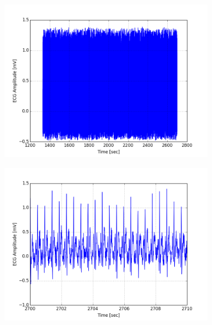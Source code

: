 \documentclass[paper=a4, fontsize=11pt]{scrartcl}
\numberwithin{equation}{section}		%
\numberwithin{figure}{section}			%
\numberwithin{table}{section}		    %
\begin{document}
\begin{appendices}
\begin{figure}[H]
	\centering
	\begin{subfigure}[b]{0.3\textwidth}
		\includegraphics[width=\textwidth]{sim/ecg_40}
	\end{subfigure}
	\begin{subfigure}[b]{0.3\textwidth}
		\includegraphics[width=\textwidth]{sim/ecg_41}
	\end{subfigure}
	\begin{subfigure}[b]{0.3\textwidth}

\end{subfigure}
\end{figure}
\end{appendices}
\end{document}
